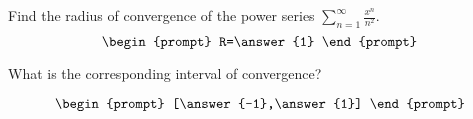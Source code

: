 \documentclass{ximera}
\author{Gregory Hartman \and Matthew Carr}
\begin{document}
\begin{exercise}




Find the radius of convergence of the power series $\sum_{n=1}^{\infty}\frac{x^n}{n^2}$.
\[
\begin{prompt}
R=\answer{1}
\end{prompt}
\]

What is the corresponding interval of convergence?

\[
\begin{prompt}
[\answer{-1},\answer{1}]
\end{prompt}
\]

\end{exercise}
\end{document}
